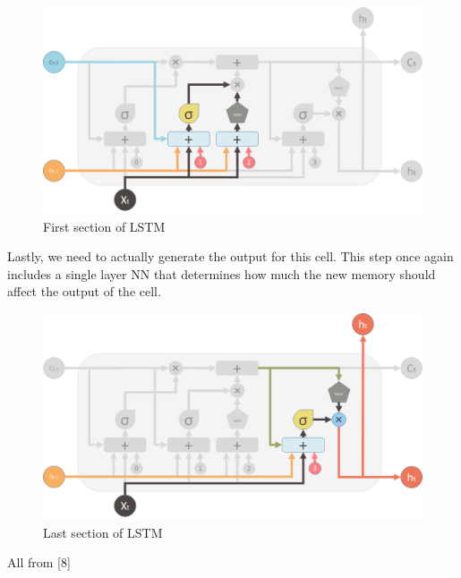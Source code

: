 \documentclass[12pt]{article}
\begin{document}
\begin{figure}[H]
  \includegraphics[width=\linewidth]{images/SecondValve.png}
  \caption{First section of LSTM}
\end{figure}

Lastly, we need to actually generate the output for this cell. This step once again includes a single layer NN that determines how much the new memory should affect the output of the cell.

\begin{figure}[H]
  \includegraphics[width=\linewidth]{images/LastValve.png}
  \caption{Last section of LSTM}
\end{figure} All from [8]\nocite{yan_2016}

\end{document}
